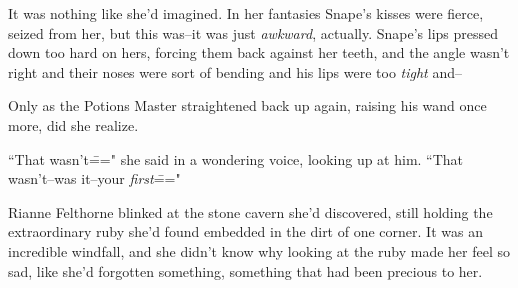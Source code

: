 It was nothing like she'd imagined. In her fantasies Snape's kisses were fierce, seized from her, but this was\---it was just \emph{awkward}, actually. Snape's lips pressed down too hard on hers, forcing them back against her teeth, and the angle wasn't right and their noses were sort of bending and his lips were too \emph{tight} and\---

Only as the Potions Master straightened back up again, raising his wand once more, did she realize.

``That wasn't\===" she said in a wondering voice, looking up at him. ``That wasn't\---was it\---your \emph{first}\==="

Rianne Felthorne blinked at the stone cavern she'd discovered, still holding the extraordinary ruby she'd found embedded in the dirt of one corner. It was an incredible windfall, and she didn't know why looking at the ruby made her feel so sad, like she'd forgotten something, something that had been precious to her.

